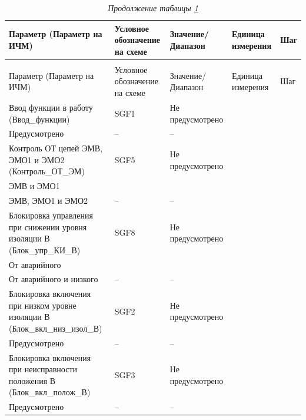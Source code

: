 \footnotesize
\begin{longtable}{|>{\centering\arraybackslash}m{5.3cm}|>{\centering\arraybackslash}m{3.3cm}|>{\centering\arraybackslash}m{4.2cm}|>{\centering\arraybackslash}m{1.8cm}|>{\centering\arraybackslash}m{1cm}|}
\caption{Параметры для настройки КСВ\hfill\vspace{-0.5\baselineskip}}\label{ksv:tbl1}\\ 
\hline
\rowcolor{unimain!40}
Параметр (Параметр на ИЧМ) & Условное обозначение на схеме & Значение/ Диапазон & Единица измерения & Шаг \\ 
\hline
\endfirsthead
\caption*{\hspace{3pt}\emph{Продолжение таблицы \ref{ksv:tbl1}\hfill\vspace{-0.5\baselineskip}}} \\ %
\hline
\rowcolor{unimain!40}
Параметр (Параметр на ИЧМ) & Условное обозначение на схеме & Значение/ Диапазон & Единица измерения & Шаг \\ 
\endhead
\endfoot
\endlastfoot
\centering Ввод функции в работу (Ввод\_функции)  & \centering SGF1 & \centering Не предусмотрено \\ Предусмотрено & \centering -- & \centering \arraybackslash -- \\
\hline
\centering Контроль ОТ цепей ЭМВ, ЭМО1 и ЭМО2 (Контроль\_ОТ\_ЭМ)  & \centering SGF5 & \centering Не предусмотрено \\ ЭМВ и ЭМО1 \\ ЭМВ, ЭМО1 и ЭМО2 & \centering -- & \centering \arraybackslash -- \\
\hline
\centering Блокировка управления при снижении уровня изоляции В (Блок\_упр\_КИ\_В)  & \centering SGF8 & \centering Не предусмотрено \\ От аварийного \\ От аварийного и низкого & \centering -- & \centering \arraybackslash -- \\
\hline
\centering Блокировка включения при низком уровне изоляции В (Блок\_вкл\_низ\_изол\_В)  & \centering SGF2 & \centering Не предусмотрено \\ Предусмотрено & \centering -- & \centering \arraybackslash -- \\
\hline
\centering Блокировка включения при неисправности положения В (Блок\_вкл\_полож\_В)  & \centering SGF3 & \centering Не предусмотрено \\ Предусмотрено & \centering -- & \centering \arraybackslash -- \\

\end{longtable}
